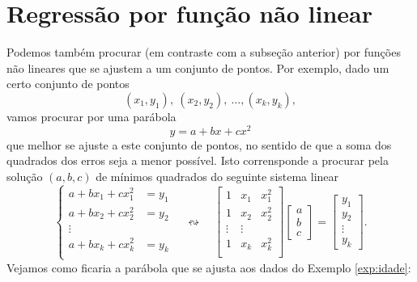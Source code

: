 \section{Regressão por função não linear}

Podemos também procurar (em contraste com a subseção anterior) por funções não lineares que se ajustem a um conjunto de pontos. Por exemplo, dado um certo conjunto de pontos
\begin{equation}
(x_1, y_1), \ (x_2, y_2), \ \dots, (x_k, y_k),
\end{equation} vamos procurar por uma parábola
\begin{equation}
y = a + bx + cx^2
\end{equation} que melhor se ajuste a este conjunto de pontos, no sentido de que a soma dos quadrados dos erros seja a menor possível. Isto corrensponde a procurar pela solução $(a,b, c)$ de mínimos quadrados do seguinte sistema linear
\begin{equation}
\left\{
  \begin{array}{rl}
    a + b x_1 + c x_1^2 &\!\!\!\!\!= y_1  \\
    a + b x_2 + c x_2^2 &\!\!\!\!\!= y_2  \\
    \vdots &  \\
    a + b x_k + c x_k^2 &\!\!\!\!\!= y_k  \\
  \end{array}
\right. \quad \leftrightsquigarrow  \quad
\begin{bmatrix}
  1 & x_1 & x_1^2 \\
  1 & x_2 & x_2^2 \\
  \vdots & \vdots \\
  1 & x_k & x_k^2 \\
\end{bmatrix}
\begin{bmatrix}
  a \\ b \\ c
\end{bmatrix} =
\begin{bmatrix}
  y_1 \\ y_2 \\ \vdots \\ y_k
\end{bmatrix}.
\end{equation} Vejamos como ficaria a parábola que se ajusta aos dados do Exemplo \ref{exp:idade}:


